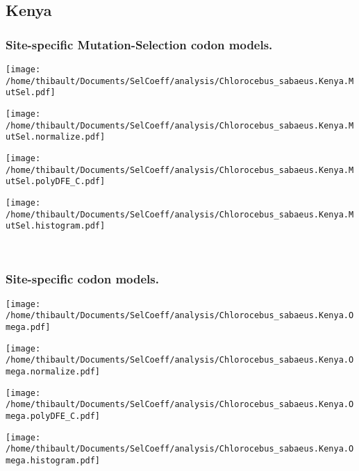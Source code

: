 \subsection{Kenya} 
 
\subsubsection*{Site-specific Mutation-Selection codon models.} 
\begin{minipage}{0.49\linewidth} 
\texttt{[image: /home/thibault/Documents/SelCoeff/analysis/Chlorocebus\_sabaeus.Kenya.MutSel.pdf]} 
\end{minipage}
\begin{minipage}{0.49\linewidth} 
\texttt{[image: /home/thibault/Documents/SelCoeff/analysis/Chlorocebus\_sabaeus.Kenya.MutSel.normalize.pdf]} 
\end{minipage}
\begin{minipage}{0.49\linewidth} 
\texttt{[image: /home/thibault/Documents/SelCoeff/analysis/Chlorocebus\_sabaeus.Kenya.MutSel.polyDFE\_C.pdf]} 
\end{minipage}
\begin{minipage}{0.49\linewidth} 
\texttt{[image: /home/thibault/Documents/SelCoeff/analysis/Chlorocebus\_sabaeus.Kenya.MutSel.histogram.pdf]} 
\end{minipage}
\\ 
\subsubsection*{Site-specific codon models.} 
\begin{minipage}{0.49\linewidth} 
\texttt{[image: /home/thibault/Documents/SelCoeff/analysis/Chlorocebus\_sabaeus.Kenya.Omega.pdf]} 
\end{minipage}
\begin{minipage}{0.49\linewidth} 
\texttt{[image: /home/thibault/Documents/SelCoeff/analysis/Chlorocebus\_sabaeus.Kenya.Omega.normalize.pdf]} 
\end{minipage}
\begin{minipage}{0.49\linewidth} 
\texttt{[image: /home/thibault/Documents/SelCoeff/analysis/Chlorocebus\_sabaeus.Kenya.Omega.polyDFE\_C.pdf]} 
\end{minipage}
\begin{minipage}{0.49\linewidth} 
\texttt{[image: /home/thibault/Documents/SelCoeff/analysis/Chlorocebus\_sabaeus.Kenya.Omega.histogram.pdf]} 
\end{minipage}
\\ 
